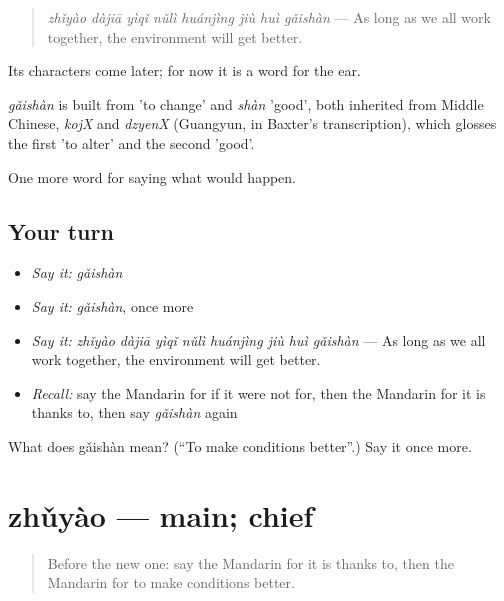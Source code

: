 \begin{quote}
\emph{zhǐyào dàjiā yìqǐ nǔlì huánjìng jiù huì gǎishàn} — As long as we all work together, the environment will get better.
\end{quote}

Its characters come later; for now it is a word for the ear.

\begin{cousinweb}
\emph{gǎishàn} is built from  'to change' and \emph{shàn} 'good', both inherited from Middle Chinese, \emph{kojX} and \emph{dzyenX} (Guangyun, in Baxter's transcription), which glosses the first 'to alter' and the second 'good'.
\end{cousinweb}

\begin{grammarlens}[title={What you've built}]
One more word for saying what would happen.
\end{grammarlens}

\subsection*{Your turn}
\begin{itemize}
\raggedright
  \item \emph{Say it:} \emph{gǎishàn}
  \item \emph{Say it:} \emph{gǎishàn}, once more
  \item \emph{Say it:} \emph{zhǐyào dàjiā yìqǐ nǔlì huánjìng jiù huì gǎishàn} — As long as we all work together, the environment will get better.
  \item \emph{Recall:} say the Mandarin for if it were not for, then the Mandarin for it is thanks to, then say \emph{gǎishàn} again
\end{itemize}

\begin{tcolorbox}[breakable,colback=teal!4,colframe=teal!35!black,title={Before you move on}]
What does gǎishàn mean? (\textquotedblleft{}To make conditions better\textquotedblright{}.) Say it once more.
\end{tcolorbox}
\section[zhǔyào]{zhǔyào — main; chief}

\label{lesson:ZH-C541-zhuyao}



\begin{quote}
Before the new one: say the Mandarin for it is thanks to, then the Mandarin for to make conditions better.
\end{quote}

